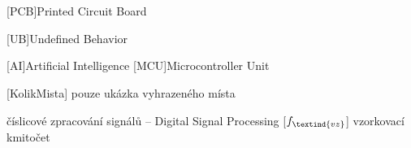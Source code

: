 \cleardoublepage
\chapter*{\listofabbrevname}
{}

\begin{acronym}[KolikMista]

	[PCB]{Printed Circuit Board}

	[UB]{Undefined Behavior}

	[AI]{Artificial Intelligence}
	[MCU]{Microcontroller Unit}

		[KolikMista]
		{pouze ukázka vyhrazeného místa}

		{číslicové zpracování signálů -- Digital Signal Processing}
		[\ensuremath{f_\textind{vz}}] %
		{vzorkovací kmitočet}					%

\end{acronym}
